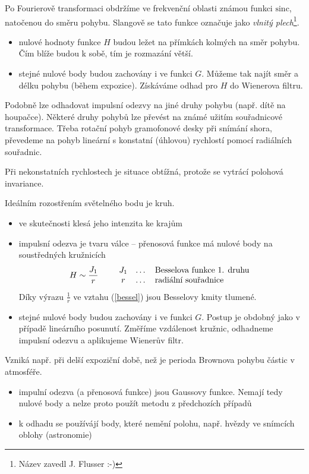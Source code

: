 Po Fourierově transformaci obdržíme ve frekvenční oblasti známou funkci $\mathrm{sinc}$, natočenou do směru pohybu. 
Slangově se tato funkce označuje jako {\em vlnitý plech}\footnote{Název zavedl J. Flusser :-)}. 

\begin{itemize}
\item nulové hodnoty funkce $H$ budou ležet na přímkách kolmých na směr pohybu. Čím blíže budou k sobě, tím je rozmazání 
větší. 
\item stejné nulové body budou zachovány i ve funkci $G$. Můžeme tak najít směr a délku pohybu (během
expozice). Získáváme odhad pro $H$ do Wienerova filtru. 
\end{itemize}

Podobně lze odhadovat impulsní odezvy na jiné druhy pohybu (např. dítě na houpačce). Některé druhy pohybů lze převést na
známé užitím souřadnicové transformace. Třeba rotační pohyb gramofonové desky při snímání shora, převedeme na pohyb 
lineární s konstatní (úhlovou) rychlostí pomocí radiálních souřadnic.

Při nekonstatních rychlostech je situace obtížná, protože se vytrácí polohová invariance.


 Ideálním rozostřením světelného bodu je kruh. 
\begin{itemize}
\item ve skutečnosti klesá jeho intenzita ke krajům
\item impulsní odezva je tvaru válce -- přenosová funkce má nulové body na soustředných kružnicích
  \begin{eqnarray}
    H\sim \frac{J_1}{r}\label{bessel}\qquad\begin{array}{ccl}\hbox{$J_1$}&\hbox{\dots}&\hbox{Besselova funkce 1. druhu}\\
    \hbox{$r$}&\hbox{\dots}&\hbox{radiální souřadnice}
    \end{array}
  \end{eqnarray}
Díky výrazu $\frac{1}{r}$ ve vztahu (\ref{bessel}) jsou Besselovy kmity tlumené.

\item stejné nulové body budou zachovány i ve funkci $G$. Postup je obdobný jako v případě lineárního posunutí.
Změříme vzdálenost kružnic, odhadneme impulsní odezvu a aplikujeme Wienerův filtr. 
\end{itemize}

 Vzniká např. při delší expoziční době, než je perioda Brownova pohybu částic v atmosféře. 
\begin{itemize}
\item impulní odezva (a přenosová funkce) jsou Gaussovy funkce. Nemají tedy nulové body a nelze proto použít metodu
z předchozích případů
\item k odhadu se používájí body, které nemění polohu, např. hvězdy ve snímcích oblohy (astronomie)
\end{itemize}

